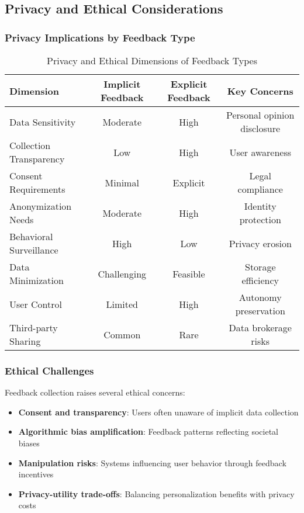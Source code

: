 \documentclass[acmsmall,review,anonymous]{acmart}
\begin{document}
\subsection{Privacy and Ethical Considerations}

\subsubsection{Privacy Implications by Feedback Type}

\begin{table}[h]
\centering
\caption{Privacy and Ethical Dimensions of Feedback Types}
\label{tab:privacy_ethics}
\begin{tabular}{@{}lccc@{}}
\toprule
Dimension & Implicit Feedback & Explicit Feedback & Key Concerns \\
\midrule
Data Sensitivity & Moderate & High & Personal opinion disclosure \\
Collection Transparency & Low & High & User awareness \\
Consent Requirements & Minimal & Explicit & Legal compliance \\
Anonymization Needs & Moderate & High & Identity protection \\
Behavioral Surveillance & High & Low & Privacy erosion \\
Data Minimization & Challenging & Feasible & Storage efficiency \\
User Control & Limited & High & Autonomy preservation \\
Third-party Sharing & Common & Rare & Data brokerage risks \\
\bottomrule
\end{tabular}
\end{table}

\subsubsection{Ethical Challenges}

Feedback collection raises several ethical concerns:
\begin{itemize}
    \item \textbf{Consent and transparency}: Users often unaware of implicit data collection
    \item \textbf{Algorithmic bias amplification}: Feedback patterns reflecting societal biases
    \item \textbf{Manipulation risks}: Systems influencing user behavior through feedback incentives
    \item \textbf{Privacy-utility trade-offs}: Balancing personalization benefits with privacy costs
\end{itemize}
\end{document}
